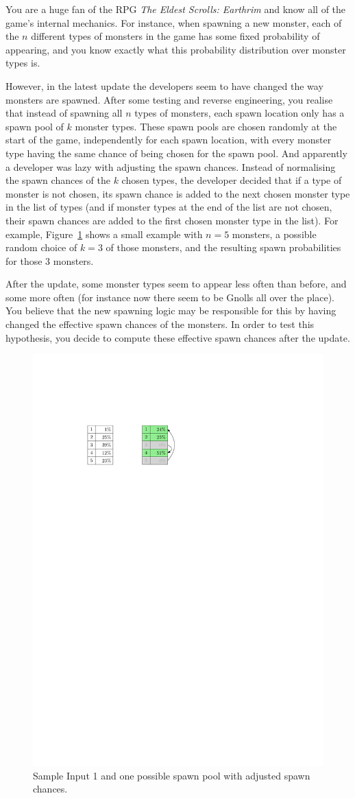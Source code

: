 
You are a huge fan of the RPG \emph{The Eldest Scrolls: Earthrim} and know all of the game's internal mechanics.
For instance, when spawning a new monster, each of the $n$ different types of monsters in the game has some fixed probability of appearing,
and you know exactly what this probability distribution over monster types is.

However, in the latest update the developers seem to have changed the way monsters are spawned.  After some testing and reverse engineering,
you realise that instead of spawning all $n$ types of monsters, each spawn location only has a spawn pool of $k$ monster types. These spawn pools are
chosen randomly at the start of the game, independently for each spawn location, with every monster type having the same chance of being chosen for the spawn pool.  And apparently
a developer was lazy with adjusting the spawn chances.  Instead of normalising the spawn chances of the $k$ chosen types, the developer decided that
if a type of monster is not chosen, its spawn chance is added to the next chosen monster type in the list of types (and if monster types at the end of the list are not
chosen, their spawn chances are added to the first chosen monster type in the list).  For example, Figure~\ref{spawning monsters sample 1} shows a small example with $n=5$ monsters, a possible random choice of $k=3$ of those monsters, and the resulting spawn probabilities for those $3$ monsters.

After the update, some monster types seem to appear less often than before, and
some more often (for instance now there seem to be Gnolls all over
the place).  You believe that the new spawning logic may be
responsible for this by having changed the effective spawn chances of
the monsters.  In order to test this hypothesis, you decide to compute
these effective spawn chances after the update.

\begin{figure}[h] \centering
  \includegraphics[width=.4\textwidth]{sample1}
  \caption{Sample Input 1 and one possible spawn pool with adjusted spawn chances.}
  \label{spawning monsters sample 1}
\end{figure}

